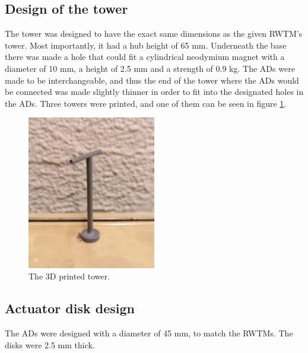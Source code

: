 \subsection{Design of the tower}
The tower was designed to have the exact same dimensions as the given \gls{RWTM}'s tower. Most importantly, it had a hub height of 65 \si{\mm}. Underneath the base there was made a hole that could fit a cylindrical neodymium magnet with a diameter of 10 \si{\mm}, a height of 2.5 \si{\mm} and a strength of 0.9 \si{\kg}. The \gls{AD}s were made to be interchangeable, and thus the end of the tower where the \gls{AD}s would be connected was made slightly thinner in order to fit into the designated holes in the \gls{AD}s. Three towers were printed, and one of them can be seen in figure \ref{fig:towers}.

\begin{figure}
    \centering
    \includegraphics[width=0.5\textwidth]{0_Images/tower.jpg}    
    \caption{The 3D printed tower.}
    \label{fig:towers}
\end{figure}


\subsection{Actuator disk design}
The \gls{AD}s were designed with a diameter of 45 mm, to match the \gls{RWTM}s. The disks were 2.5 \si{\mm} thick.

